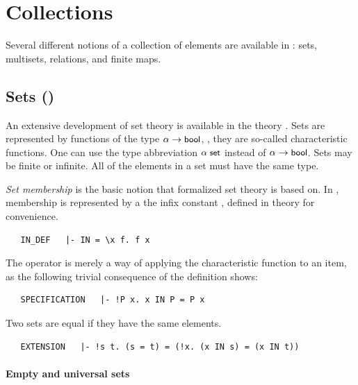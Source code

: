 \section{Collections}

Several different notions of a collection of elements are available in
\HOL: sets, multisets, relations, and finite maps.

\subsection{Sets ()}

An extensive development of set theory is available in the theory
. Sets are represented by functions of the type
$\alpha \to \mbox{\small{\textbf{\sf{bool}}}}$, \ie, they are so-called characteristic
functions.
%
%
One can use the type abbreviation $\alpha\; \mbox{\small{\textbf{\sf{set}}}}$
instead of $\alpha \to \mbox{\small{\textbf{\sf{bool}}}}$. Sets may be finite or
infinite. All of the elements in a set must have the same type.

\emph{Set membership} is the basic notion that formalized set theory
is based on. In \HOL, membership is represented by a the infix
constant , defined in theory  for
convenience.
\begin{hol}
\begin{verbatim}
   IN_DEF   |- IN = \x f. f x
\end{verbatim}
\end{hol}
The  operator is merely a way of applying the
characteristic function to an item, as the following trivial
consequence of the definition shows:
\begin{hol}
\begin{verbatim}
   SPECIFICATION   |- !P x. x IN P = P x
\end{verbatim}
\end{hol}
Two sets are equal if they have the same elements.
\begin{hol}
\begin{verbatim}
   EXTENSION   |- !s t. (s = t) = (!x. (x IN s) = (x IN t))
\end{verbatim}
\end{hol}

\paragraph{Empty and universal sets}

